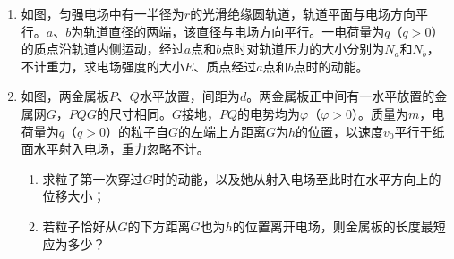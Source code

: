 \begin{enumerate}[leftmargin=0em]




\item
{}
如图，匀强电场中有一半径为$ r $的光滑绝缘圆轨道，轨道平面与电场方向平行。$ a $、$ b $为轨道直径的两端，该直径与电场方向平行。一电荷量为$ q $（$ q>0 $）的质点沿轨道内侧运动，经过$ a $点和$ b $点时对轨道压力的大小分别为$ N_a $和$ N_b $，不计重力，求电场强度的大小$ E $、质点经过$ a $点和$ b $点时的动能。
\begin{figure}[h!]
\flushright

\end{figure}







\item
{}
如图，两金属板$ P $、$ Q $水平放置，间距为$ d $。两金属板正中间有一水平放置的金属网$ G $，$ PQG $的尺寸相同。$ G $接地，$ PQ $的电势均为$ \varphi $（$ \varphi>0 $）。质量为$ m $，电荷量为$ q $（$ q>0 $）的粒子自$ G $的左端上方距离$ G $为$ h $的位置，以速度$ v_{0} $平行于纸面水平射入电场，重力忽略不计。
\begin{enumerate}
\renewcommand{\labelenumi}{\arabic{enumi}.}
\item
求粒子第一次穿过$ G $时的动能，以及她从射入电场至此时在水平方向上的位移大小；
\item 
若粒子恰好从$ G $的下方距离$ G $也为$ h $的位置离开电场，则金属板的长度最短应为多少？


\end{enumerate}
\begin{figure}[h!]
\flushright

\end{figure}





\end{enumerate}






